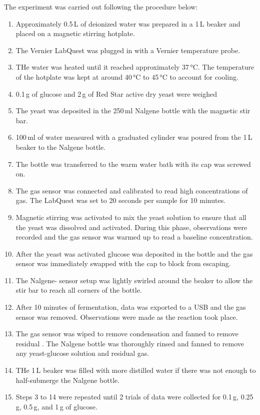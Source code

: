 \documentclass{article}
\begin{document}
The experiment was carried out following the procedure below:
\begin{enumerate}[topsep=\parskip, noitemsep]
    \item Approximately 0.5\,\si{L} of deionized water was prepared in a 1\,\si{L} beaker and placed on a magnetic stirring hotplate.
    \item The Vernier LabQuest was plugged in with a Vernier temperature probe.
    \item THe water was heated until it reached approximately 37\,\si{\celsius}. The temperature of the hotplate was kept at around 40\,\si{\celsius} to 45\,\si{\celsius} to account for cooling.
    \item 0.1\,\si{g} of glucose and 2\,\si{g} of Red Star active dry yeast were weighed
    \item The yeast was deposited in the 250\,\si{ml} Nalgene bottle with the magnetic stir bar.
    \item 100\,\si{ml} of water measured with a graduated cylinder was poured from the 1\,\si{L} beaker to the Nalgene bottle.
    \item The bottle was transferred to the warm water bath with its cap was screwed on.
    \item The  gas sensor was connected and calibrated to read high concentrations of  gas. The LabQuest was set to 20 seconds per sample for 10 minutes.
    \item Magnetic stirring was activated to mix the yeast solution to ensure that all the yeast was dissolved and activated. During this phase, observations were recorded and the  gas sensor was warmed up to read a baseline concentration.
    \item After the yeast was activated glucose was deposited in the bottle and the  gas sensor was immediately swapped with the cap to block  from escaping.
    \item The Nalgene- sensor setup was lightly swirled around the beaker to allow the stir bar to reach all corners of the bottle.
    \item After 10 minutes of fermentation, data was exported to a USB and the  gas sensor was removed. Observations were made as the reaction took place.
    \item The  gas sensor was wiped to remove condensation and fanned to remove residual . The Nalgene bottle was thoroughly rinsed and fanned to remove any yeast-glucose solution and residual  gas.
    \item THe 1\,\si{L} beaker was filled with more distilled water if there was not enough to half-submerge the Nalgene bottle.
    \item Steps 3 to 14 were repeated until 2 trials of data were collected for 0.1\,\si{g}, 0.25\,\si{g}, 0.5\,\si{g}, and 1\,\si{g} of glucose.
\end{enumerate}
\end{document}
